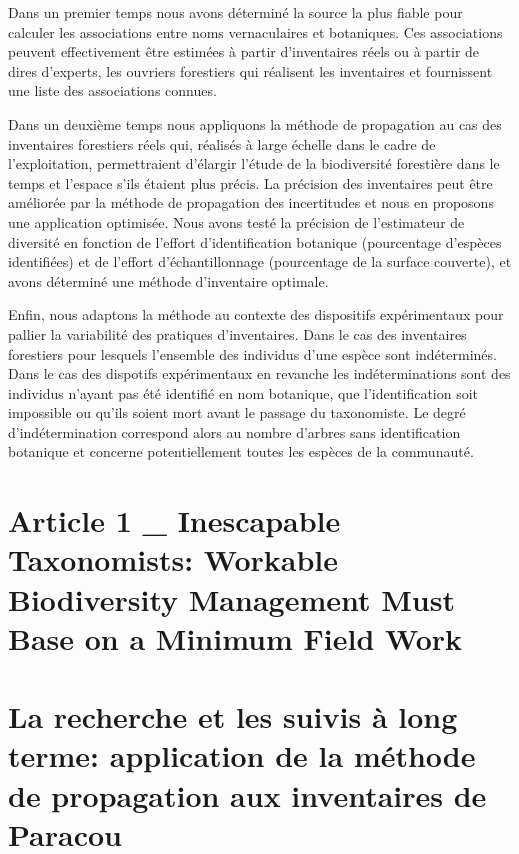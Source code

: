 \documentclass[
  11pt,
  french,
  A4paper,
  extrafontsizes,onecolumn,openright
  ]{memoir}
\begin{document}
Dans un premier temps nous avons déterminé la source la plus fiable pour
calculer les associations entre noms vernaculaires et botaniques. Ces
associations peuvent effectivement être estimées à partir d'inventaires
réels ou à partir de dires d'experts, les ouvriers forestiers qui
réalisent les inventaires et fournissent une liste des associations
connues.

Dans un deuxième temps nous appliquons la méthode de propagation au cas
des inventaires forestiers réels qui, réalisés à large échelle dans le
cadre de l'exploitation, permettraient d'élargir l'étude de la
biodiversité forestière dans le temps et l'espace s'ils étaient plus
précis. La précision des inventaires peut être améliorée par la méthode
de propagation des incertitudes et nous en proposons une application
optimisée. Nous avons testé la précision de l'estimateur de diversité en
fonction de l'effort d'identification botanique (pourcentage d'espèces
identifiées) et de l'effort d'échantillonnage (pourcentage de la surface
couverte), et avons déterminé une méthode d'inventaire optimale.

Enfin, nous adaptons la méthode au contexte des dispositifs
expérimentaux pour pallier la variabilité des pratiques d'inventaires.
Dans le cas des inventaires forestiers pour lesquels l'ensemble des
individus d'une espèce sont indéterminés. Dans le cas des dispotifs
expérimentaux en revanche les indéterminations sont des individus
n'ayant pas été identifié en nom botanique, que l'identification soit
impossible ou qu'ils soient mort avant le passage du taxonomiste. Le
degré d'indétermination correspond alors au nombre d'arbres sans
identification botanique et concerne potentiellement toutes les espèces
de la communauté.

\section{Article 1 \_ Inescapable Taxonomists: Workable Biodiversity
Management Must Base on a Minimum Field
Work}\label{article-1-_-inescapable-taxonomists-workable-biodiversity-management-must-base-on-a-minimum-field-work}

\section{La recherche et les suivis à long terme: application de la
méthode de propagation aux inventaires de
Paracou}\label{la-recherche-et-les-suivis-a-long-terme-application-de-la-methode-de-propagation-aux-inventaires-de-paracou}
\end{document}
